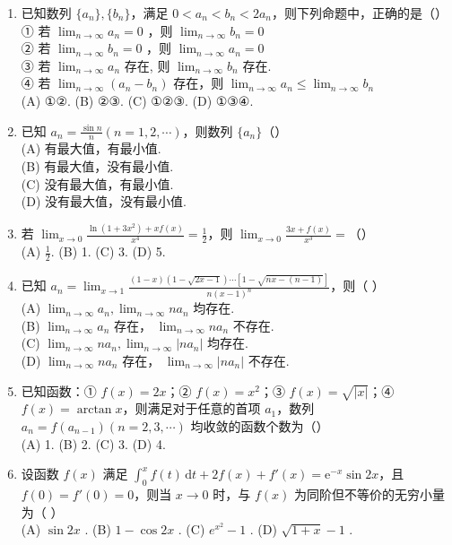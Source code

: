 \documentclass[12pt, a4paper]{ctexart}
\begin{document}
\begin{enumerate}
    \item 已知数列 $ \{a_{n}\},\{b_{n}\} $，满足 $ 0<a_{n}<b_{n}<2a_{n} $，则下列命题中，正确的是（）\\
    ① 若 $ \lim_{n\to\infty}a_{n}=0 $ ，则 $ \lim_{n\to\infty}b_{n}=0 $\\
    ② 若 $ \lim_{n\to\infty}b_{n}=0 $ ，则 $ \lim_{n\to\infty}a_{n}=0 $\\
    ③ 若 $ \lim_{n\to\infty}a_{n} $ 存在, 则 $ \lim_{n\to\infty}b_{n} $ 存在.\\
    ④ 若 $ \lim_{n\to\infty}\left(a_{n}-b_{n}\right) $ 存在，则 $ \lim_{n\to\infty}a_{n}\leq\lim_{n\to\infty}b_{n} $\\
    (A) ①②. \quad (B) ②③. \quad (C) ①②③. \quad (D) ①③④.

    \item 已知 $ a_{n}=\frac{\sin n}{n}(n=1,2,\cdots) $，则数列 $ \{a_{n}\} $（）\\
    (A) 有最大值，有最小值.\\
    (B) 有最大值，没有最小值.\\
    (C) 没有最大值，有最小值.\\
    (D) 没有最大值，没有最小值.

    \item 若 $ \lim_{x\to0}\frac{\ln\left(1+3x^{2}\right)+xf(x)}{x^{4}}=\frac{1}{2} $，则 $ \lim_{x\to0}\frac{3x+f(x)}{x^{3}}= $（）\\
    (A) $ \frac{1}{2} $. (B) 1. (C) 3. (D) 5.

    \item 已知 $ a_n = \lim_{x \to 1} \frac{(1-x)(1-\sqrt{2x-1})\cdots[1-\sqrt{nx-(n-1)}]}{n(x-1)^n} $，则（ ）\\
    (A) $ \lim_{n \to \infty} a_n, \lim_{n \to \infty} na_n $ 均存在.\\
    (B) $ \lim_{n \to \infty} a_n $ 存在， $ \lim_{n \to \infty} na_n $ 不存在.\\
    (C) $ \lim_{n \to \infty} na_n, \lim_{n \to \infty} |na_n| $ 均存在.\\
    (D) $ \lim_{n \to \infty} na_n $ 存在， $ \lim_{n \to \infty} |na_n| $ 不存在.

    \item 已知函数：① $ f(x)=2x $；② $ f(x)=x^{2} $；③ $ f(x)=\sqrt{|x|} $；④ $ f(x)=\arctan x $，则满足对于任意的首项 $ a_{1} $，数列 $ a_{n}=f(a_{n-1})(n=2,3,\cdots) $ 均收敛的函数个数为（）\\
    (A) 1. \quad (B) 2. \quad (C) 3. \quad (D) 4.

    \item 设函数 $ f(x) $ 满足 $ \int_{0}^{x} f(t) \, \mathrm{d}t + 2f(x) + f'(x) = \mathrm{e}^{-x} \sin 2x $，且 $ f(0) = f'(0) = 0 $，则当 $ x \to 0 $ 时，与 $ f(x) $ 为同阶但不等价的无穷小量为（ ）\\
    (A) $ \sin 2x $ . \quad (B) $ 1 - \cos 2x $ . \quad (C) $ e^{x^2} - 1 $ . \quad (D) $ \sqrt{1 + x} - 1 $ .


\end{enumerate}
\end{document}
